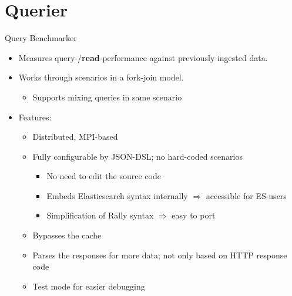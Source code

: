 \documentclass[compress,aspectratio=169]{beamer}
\begin{document}
	\section{Querier}
	\begin{frame}{Query Benchmarker}
		\begin{itemize}
      \item Measures query-/\textbf{read}-performance against previously ingested data.
        \pause
      \item Works through scenarios in a fork-join model.
        \begin{itemize}
          \item Supports mixing queries in same scenario
        \end{itemize}
        \pause
      \item Features:
        \begin{itemize}
          \item Distributed, MPI-based
            \pause
          \item Fully configurable by JSON-DSL; no hard-coded scenarios
            \begin{itemize}
              \item No need to edit the source code
              \item Embeds Elasticsearch syntax internally $\Rightarrow$ accessible for ES-users
              \item Simplification of Rally syntax $\Rightarrow$ easy to port
            \end{itemize}
            \pause
          \item Bypasses the cache
            \pause
          \item Parses the responses for more data; not only based on HTTP response code
            \pause
          \item Test mode for easier debugging
        \end{itemize}
		\end{itemize}
	\end{frame}

  \begin{frame}[fragile]{}
    \begin{tcolorbox}[title=Input Format for Query Benchmarker (part 1)]
    \footnotesize\inputminted[xleftmargin=1em,linenos]{text}{./assets/queryinput.json}
    \end{tcolorbox}
  \end{frame}
  \begin{frame}[fragile]{}
    \begin{tcolorbox}[title=Input Format for Query Benchmarker (part 2)]
    \footnotesize\inputminted[xleftmargin=1em,linenos]{text}{./assets/queryinput2.json}
    \end{tcolorbox}
  \end{frame}
\end{document}
